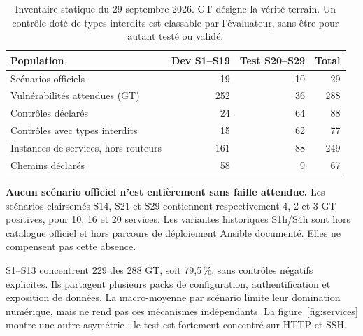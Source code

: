\documentclass[11pt,a4paper]{article}
\begin{document}
\begin{table}[htbp]
\centering\small
\noindent\begin{tabularx}{\linewidth}{Yrrr}
\toprule
Population & Dev S1--S19 & Test S20--S29 & Total \\
\midrule
Scénarios officiels & 19 & 10 & 29 \\
Vulnérabilités attendues (GT) & 252 & 36 & 288 \\
Contrôles déclarés & 24 & 64 & 88 \\
Contrôles avec types interdits & 15 & 62 & 77 \\
Instances de services, hors routeurs & 161 & 88 & 249 \\
Chemins déclarés & 58 & 9 & 67 \\
\bottomrule
\end{tabularx}
\caption{Inventaire statique du 29 septembre 2026. GT désigne la vérité terrain. Un contrôle doté de types interdits est classable par l'évaluateur, sans être pour autant testé ou validé.}
\label{tab:corpus}
\end{table}

\textbf{Aucun scénario officiel n'est entièrement sans faille attendue.} Les scénarios clairsemés S14, S21 et S29 contiennent respectivement 4, 2 et 3 GT positives, pour 10, 16 et 20 services. Les variantes historiques S1h/S4h sont hors catalogue officiel et hors parcours de déploiement Ansible documenté. Elles ne compensent pas cette absence.

S1--S13 concentrent 229 des 288 GT, soit 79,5\,\%, sans contrôles négatifs explicites. Ils partagent plusieurs packs de configuration, authentification et exposition de données. La macro-moyenne par scénario limite leur domination numérique, mais ne rend pas ces mécanismes indépendants. La figure~\ref{fig:services} montre une autre asymétrie : le test est fortement concentré sur HTTP et SSH.
\end{document}
